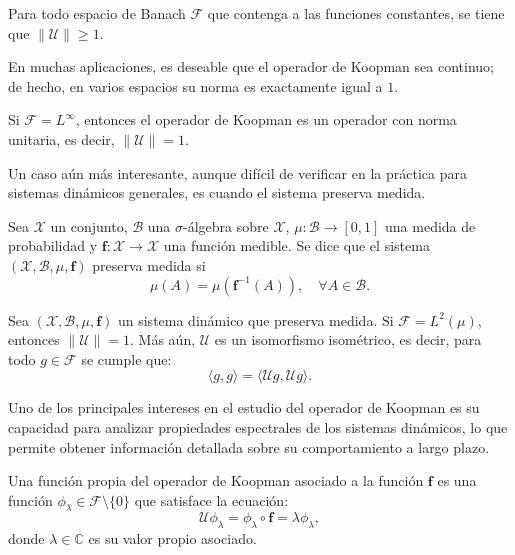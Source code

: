 \begin{prop}
    Para todo espacio de Banach $\mathcal{F}$ que contenga a las funciones constantes, se tiene que $\|\mathcal{U}\| \geq 1$.
\end{prop}

En muchas aplicaciones, es deseable que el operador de Koopman sea continuo; de hecho, en varios espacios su norma es exactamente igual a $1$.

\begin{prop}
    Si $\mathcal{F} = L^\infty$, entonces el operador de Koopman es un operador con norma unitaria, es decir, $\|\mathcal{U}\| = 1$.
\end{prop}

Un caso aún más interesante, aunque difícil de verificar en la práctica para sistemas dinámicos generales, es cuando el sistema preserva medida.

\begin{defn}
    Sea $\mathcal{X}$ un conjunto, $\mathcal{B}$ una $\sigma$-álgebra sobre $\mathcal{X}$, $\mu: \mathcal{B} \to [0, 1]$ una medida de probabilidad y $\mathbf{f}: \mathcal{X} \to \mathcal{X}$ una función medible. Se dice que el sistema $(\mathcal{X}, \mathcal{B}, \mu, \mathbf{f})$ preserva medida si 
    \begin{equation*}
        \mu(A) = \mu(\mathbf{f}^{-1}(A)), \quad \forall A \in \mathcal{B}.
    \end{equation*}
\end{defn}

\begin{prop}
    Sea $(\mathcal{X}, \mathcal{B}, \mu, \mathbf{f})$ un sistema dinámico que preserva medida. Si $\mathcal{F} = L^2 (\mu)$, entonces $\|\mathcal{U}\| = 1$. Más aún, $\mathcal{U}$ es un isomorfismo isométrico, es decir, para todo $g \in \mathcal{F}$ se cumple que:
    \begin{equation*}
        \langle g, g \rangle = \langle \mathcal{U}g, \mathcal{U}g \rangle.
    \end{equation*}
\end{prop}

Uno de los principales intereses en el estudio del operador de Koopman es su capacidad para analizar propiedades espectrales de los sistemas dinámicos, lo que permite obtener información detallada sobre su comportamiento a largo plazo.

\begin{defn}
    Una función propia del operador de Koopman asociado a la función $\mathbf{f}$ es una función $\phi_\lambda \in \mathcal{F} \setminus \{ 0 \}$ que satisface la ecuación:
    \begin{equation*}
        \mathcal{U} \phi_\lambda = \phi_\lambda \circ \mathbf{f} = \lambda \phi_\lambda,
    \end{equation*}
    donde $\lambda \in \mathbb{C}$ es su valor propio asociado.
\end{defn}

